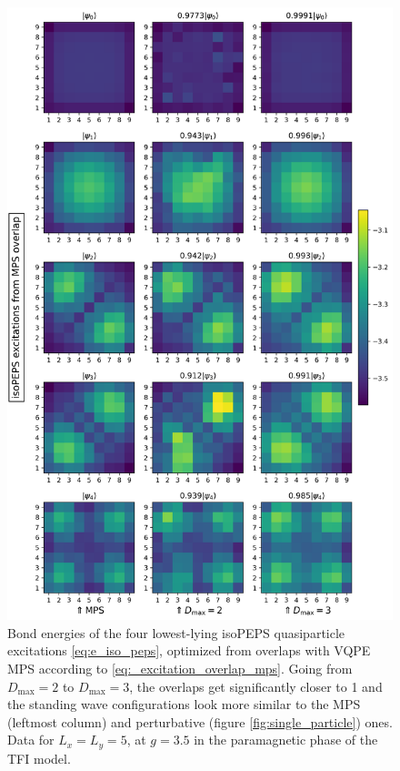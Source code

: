 \newpage
\begin{figure}[H]
  \centering
  \includegraphics[width=0.85\linewidth]{excitations_5_5_3.5_overlap_mps.png}
  \caption{Bond energies of the four lowest-lying isoPEPS quasiparticle excitations \eqref{eq:e_iso_peps}, optimized from overlaps with VQPE MPS according to \eqref{eq:_excitation_overlap_mps}. Going from $D_{\text{max}} = 2$ to $D_{\text{max}} = 3$, the overlaps get significantly closer to 1 and the standing wave configurations look more similar to the MPS (leftmost column) and perturbative (figure \ref{fig:single_particle}) ones. Data for $L_x = L_y = 5$, at $g = 3.5$ in the paramagnetic phase of the TFI model.}
 \label{fig:excitations_overlap_mps}
\end{figure}

